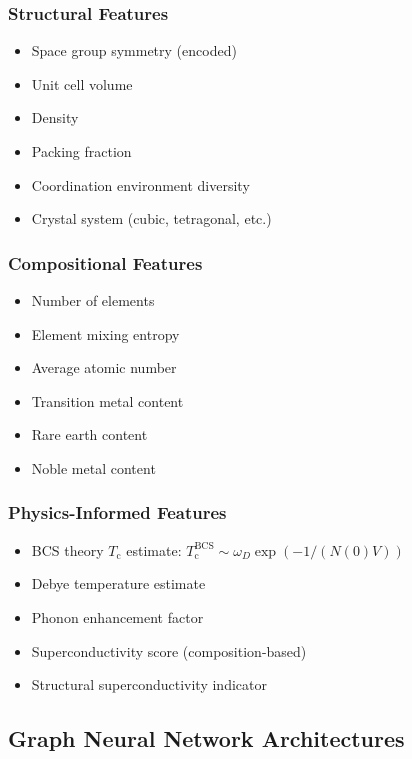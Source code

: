 \documentclass[11pt,a4paper]{article}
\begin{document}
\subsubsection{Structural Features}
\begin{itemize}
    \item Space group symmetry (encoded)
    \item Unit cell volume
    \item Density
    \item Packing fraction
    \item Coordination environment diversity
    \item Crystal system (cubic, tetragonal, etc.)
\end{itemize}

\subsubsection{Compositional Features}
\begin{itemize}
    \item Number of elements
    \item Element mixing entropy
    \item Average atomic number
    \item Transition metal content
    \item Rare earth content
    \item Noble metal content
\end{itemize}

\subsubsection{Physics-Informed Features}
\begin{itemize}
    \item BCS theory $T_{\text{c}}$ estimate: $T_{\text{c}}^{\text{BCS}} \sim \omega_D \exp(-1/(N(0)V))$
    \item Debye temperature estimate
    \item Phonon enhancement factor
    \item Superconductivity score (composition-based)
    \item Structural superconductivity indicator
\end{itemize}

\subsection{Graph Neural Network Architectures}
\end{document}
